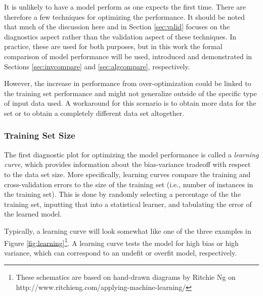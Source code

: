 It is unlikely to have a model perform as one expects the first time. There are
therefore a few techniques for optimizing the performance. It should be noted
that much of the discussion here and in Section \ref{sec:valid} focuses on
the diagnostics aspect rather than the validation aspect of these techniques.
In practice, these are used for both purposes, but in this work the formal
comparison of model performance will be used, introduced and demonstrated in
Sections \ref{sec:invcompare} and \ref{sec:algcompare}, respectively. 

However, the increase in performance from over-optimization could be linked to
the training set performance and might not generalize outside of the specific
type of input data used.  A workaround for this scenario is to obtain more data
for the set or to obtain a completely different data set altogether. 

\subsubsection{Training Set Size}

The first diagnostic plot for optimizing the model performance is called a
\textit{learning curve}, which provides information about the bias-variance
tradeoff with respect to the data set size. More specifically, learning curves
compare the training and cross-validation errors to the size of the training
set (i.e., number of instances in the training set). This is done by randomly
selecting a percentage of the the training set, inputting that into a
statistical learner, and tabulating the error of the learned model. 

Typically, a learning curve will look somewhat like one of the three examples
in Figure \ref{fig:learning}\footnote{These schematics are based on hand-drawn
diagrams by Ritchie Ng on http://www.ritchieng.com/applying-machine-learning/}.
A learning curve tests the model for high bias or high variance, which can
correspond to an undefit or overfit model, respectively. 


